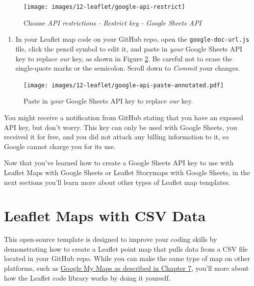 \documentclass[
  english,
]{book}
\providecommand{\tightlist}{%
  \setlength{\itemsep}{0pt}\setlength{\parskip}{0pt}}
\begin{document}
\begin{figure}
\texttt{[image: images/12-leaflet/google-api-restrict]} \caption{Choose \emph{API restrictions - Restrict key - Google Sheets API}}\label{fig:google-api-restrict}
\end{figure}

\begin{enumerate}
\def\labelenumi{\arabic{enumi}.}
\setcounter{enumi}{9}
\tightlist
\item
  In your Leaflet map code on your GitHub repo, open the \texttt{google-doc-url.js} file, click the pencil symbol to edit it, and paste in \emph{your} Google Sheets API key to replace \emph{our} key, as shown in Figure \ref{fig:google-api-paste}. Be careful not to erase the single-quote marks or the semicolon. Scroll down to \emph{Commit} your changes.
\end{enumerate}



\begin{figure}
\centering
\texttt{[image: images/12-leaflet/google-api-paste-annotated.pdf]}
\caption{\label{fig:google-api-paste}Paste in \emph{your} Google Sheets API key to replace \emph{our} key.}
\end{figure}

You might receive a notification from GitHub stating that you have an exposed API key, but don't worry. This key can only be used with Google Sheets, you received it for free, and you did not attach any billing information to it, so Google cannot charge you for its use.

Now that you've learned how to create a Google Sheets API key to use with Leaflet Maps with Google Sheets or Leaflet Storymaps with Google Sheets, in the next sections you'll learn more about other types of Leaflet map templates.

\hypertarget{leaflet-maps-with-csv}{%
\section*{Leaflet Maps with CSV Data}\label{leaflet-maps-with-csv}}

This open-source template is designed to improve your coding skills by demonstrating how to create a Leaflet point map that pulls data from a CSV file located in your GitHub repo. While you can make the same type of map on other platforms, such as \href{mymaps.html}{Google My Maps as described in Chapter 7}, you'll more about how the Leaflet code library works by doing it yourself.
\end{document}
